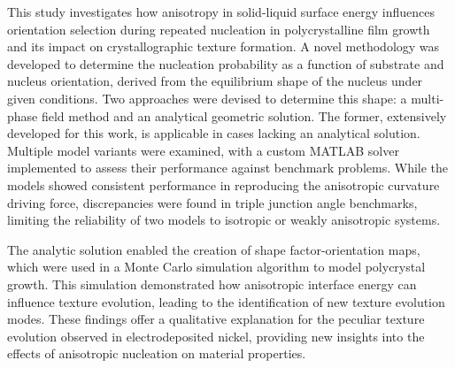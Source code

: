 This study investigates how anisotropy in solid-liquid surface energy influences orientation selection during repeated nucleation in polycrystalline film growth and its impact on crystallographic texture formation. A novel methodology was developed to determine the nucleation probability as a function of substrate and nucleus orientation, derived from the equilibrium shape of the nucleus under given conditions. Two approaches were devised to determine this shape: a multi-phase field method and an analytical geometric solution. The former, extensively developed for this work, is applicable in cases lacking an analytical solution. Multiple model variants were examined, with a custom MATLAB solver implemented to assess their performance against benchmark problems. While the models showed consistent performance in reproducing the anisotropic curvature driving force, discrepancies were found in triple junction angle benchmarks, limiting the reliability of two models to isotropic or weakly anisotropic systems.

The analytic solution enabled the creation of shape factor-orientation maps, which were used in a Monte Carlo simulation algorithm to model polycrystal growth. This simulation demonstrated how anisotropic interface energy can influence texture evolution, leading to the identification of new texture evolution modes. These findings offer a qualitative explanation for the peculiar texture evolution observed in electrodeposited nickel, providing new insights into the effects of anisotropic nucleation on material properties.


